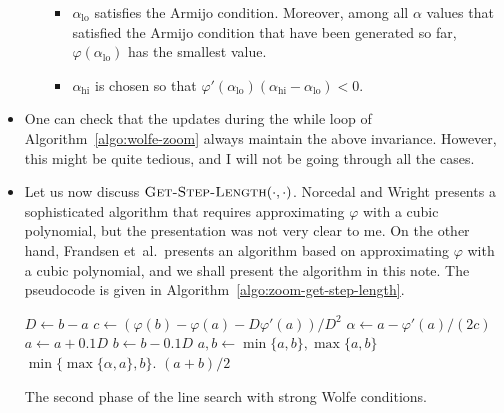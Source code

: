 \documentclass[10pt]{article}
\newcommand{\mrm}[1]{\mathrm{#1}}
\newcommand{\etal}{{et~al.}}
\begin{document}
\begin{itemize}
\begin{itemize}
\begin{itemize}
            \item $\alpha_{\mrm{lo}}$ satisfies the Armijo condition. Moreover, among all $\alpha$ values that satisfied the Armijo condition that have been generated so far, $\varphi(\alpha_{\mrm{lo}})$ has the smallest value.
            
            \item $\alpha_{\mrm{hi}}$ is chosen so that $\varphi'(\alpha_{\mrm{lo}})(\alpha_{\mrm{hi}} - \alpha_{\mrm{lo}}) < 0$.
        \end{itemize}
    \end{itemize}
    
    \item One can check that the updates during the while loop of Algorithm~\ref{algo:wolfe-zoom} always maintain the above invariance. However, this might be quite tedious, and I will not be going through all the cases.
    
    \item Let us now discuss $\Call{Get-Step-Length}{\cdot,\cdot}$. Norcedal and Wright presents a sophisticated algorithm that requires approximating $\varphi$ with a cubic polynomial, but the presentation was not very clear to me. On the other hand, Frandsen \etal\ presents an algorithm based on approximating $\varphi$ with a cubic polynomial, and we shall present the algorithm in this note. The pseudocode is given in Algorithm~\ref{algo:zoom-get-step-length}.
    
    \begin{algorithm}[t]      
        \begin{algorithmic}
                \State $D \gets b - a$
                \State $c \gets (\varphi(b) - \varphi(a) - D \varphi'(a)) / D^2$
                    \State $\alpha \gets a - \varphi'(a) / (2c)$
                    \State $a \gets a + 0.1D$
                    \State $b \gets b - 0.1D$
                    \State $a,b \gets \min\{ a, b\}, \max\{a, b\}$
                    \State \Return $\min\{\max\{\alpha, a\}, b\}$.
                \Else
                    \State \Return $(a+b)/2$
                \EndIf
            \EndProcedure
        \end{algorithmic}  
        \caption{The second phase of the line search with strong Wolfe conditions.}
        \label{algo:zoom-get-step-length}
    \end{algorithm}


\end{itemize}
\end{document}
